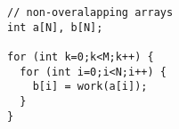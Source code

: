 \begin{lstlisting}[morekeywords={g_qCount},belowskip=0pt]
// non-overalapping arrays
int a[N], b[N];

for (int k=0;k<M;k++) {
  for (int i=0;i<N;i++) {
    b[i] = work(a[i]);
  }
}
\end{lstlisting}
